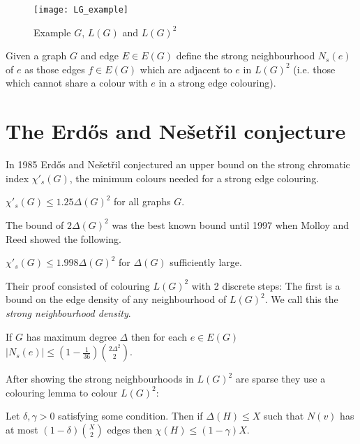 \begin{figure}[ht]
    \centering
    \texttt{[image: LG\_example]}
    \caption{Example $G$, $L(G)$ and $L(G)^2$}
    \label{fig:lg_example}
\end{figure}

\begin{definition}
    Given a graph $G$ and edge $E \in E(G)$ define the strong neighbourhood
    $N_s(e)$ of $e$ as those edges $f \in E(G)$ which are adjacent to $e$ in 
    $L(G)^2$ (i.e. those which cannot share a colour with $e$ in a strong edge colouring).
\end{definition}

\section{The Erd\H{o}s and Nešetřil conjecture}

In 1985 Erd\H{o}s and Nešetřil \cite{faudreeInducedMatchingsBipartite1989} conjectured an
upper bound on the strong chromatic index $\chi'_s(G)$, the minimum colours needed for
a strong edge colouring.

\begin{conjecture}
    $\chi'_s(G) \leq 1.25\Delta(G)^2$ for all graphs $G$.
\end{conjecture}

The bound of $2\Delta(G)^2$ was the best known bound until 1997 when Molloy and Reed
showed the following.
\begin{knowntheorem}
    $\chi'_s(G) \leq 1.998\Delta(G)^2$ for $\Delta(G)$ sufficiently large.
\end{knowntheorem}

Their proof consisted of colouring $L(G)^2$ with 2 discrete steps:
The first is a bound on the edge density of any neighbourhood of $L(G)^2$. We call
this the \textit{strong neighbourhood density}.
\begin{knownlemma}
    If $G$ has maximum degree $\Delta$ then for each $e\in E(G)$
    $|N_s(e)| \leq (1-\frac{1}{36})\binom{2\Delta^2}{2}$.
\end{knownlemma}
After showing the strong neighbourhoods in $L(G)^2$ are sparse they use a colouring
lemma to colour $L(G)^2$:
\begin{knownlemma}
    Let $\delta, \gamma > 0$ satisfying some condition. Then if
    $\Delta(H) \leq X$ such that $N(v)$ has at most $(1-\delta)\binom{X}{2}$ edges
    then $\chi(H)\leq (1-\gamma)X$.
\end{knownlemma}

